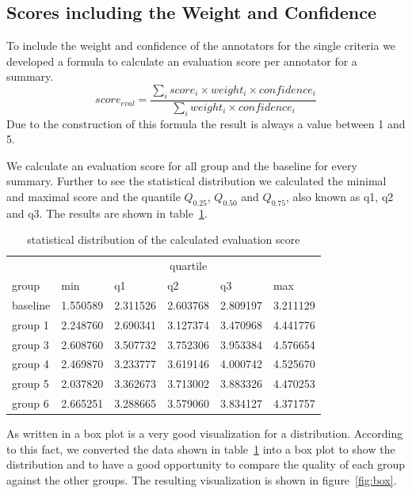 \subsection{Scores including the Weight and Confidence}
\label{eva:box}
To include the weight and confidence of the annotators for the single criteria we developed a formula to calculate an evaluation score per annotator for a summary.
$$score_{eval} = \frac{\sum_i score_i \times weight_i \times confidence_i}{\sum_i weight_i \times confidence_i}$$
Due to the construction of this formula the result is always a value between 1 and 5.

We calculate an evaluation score for all group and the baseline for every summary.
Further to see the statistical distribution we calculated the minimal and maximal score and the quantile $Q_{0.25}$, $Q_{0.50}$ and $Q_{0.75}$, also known as q1, q2 and q3.
The results are shown in table~\ref{tab:evascore}.
\begin{table}[H]
	\begin{tabularx}{\textwidth}{X|XXXXX} \toprule
		         & \multicolumn{5}{c}{quartile}                         \\
		group    & min      & q1       & q2       & q3       & max      \\ \midrule
		baseline & 1.550589 & 2.311526 & 2.603768 & 2.809197 & 3.211129 \\
		group 1  & 2.248760 & 2.690341 & 3.127374 & 3.470968 & 4.441776 \\
		group 3  & 2.608760 & 3.507732 & 3.752306 & 3.953384 & 4.576654 \\
		group 4  & 2.469870 & 3.233777 & 3.619146 & 4.000742 & 4.525670 \\
		group 5  & 2.037820 & 3.362673 & 3.713002 & 3.883326 & 4.470253 \\
		group 6  & 2.665251 & 3.288665 & 3.579060 & 3.834127 & 4.371757 \\ \bottomrule
	\end{tabularx}
	\caption{statistical distribution of the calculated evaluation score}
	\label{tab:evascore}
\end{table}

As written in \citet{vis_mem} a box plot is a very good visualization for a distribution.
According to this fact, we converted the data shown in table~\ref{tab:evascore} into a box plot to show the distribution and to have a good opportunity to compare the quality of each group against the other groups. The resulting visualization is shown in figure~\ref{fig:box}.

